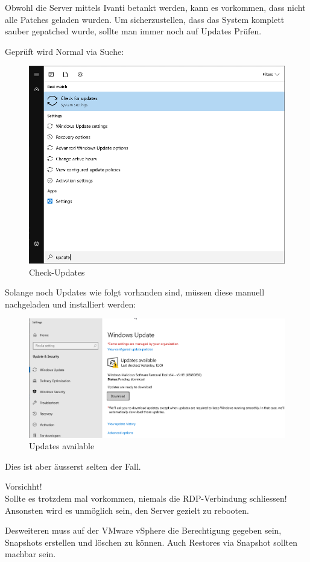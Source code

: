 \begin{flushleft}
    Obwohl die Server mittels \Gls{Ivanti} betankt werden, kann es vorkommen, dass nicht alle Patches geladen wurden.
    Um sicherzustellen, dass das System komplett sauber gepatched wurde, sollte man immer noch auf Updates Prüfen.

    Geprüft wird Normal via Suche:
    \begin{figure}[H]
        \centering
        \includegraphics[width=1\linewidth]{source/general/search_for_updates}
        \caption{Check-Updates}
        \label{fig:check-updates}
    \end{figure}

    Solange noch Updates wie folgt vorhanden sind, müssen diese manuell nachgeladen und installiert werden:
    \begin{figure}[H]
        \centering
        \includegraphics[width=1\linewidth]{source/general/updates_available}
        \caption{Updates available}
        \label{fig:updates-available}
    \end{figure}

    Dies ist aber äusserst selten der Fall.

    \begin{mdframed}
    Vorsichht!\\Sollte es trotzdem mal vorkommen, niemals die \Gls{RDP}-Verbindung schliessen!\\Ansonsten wird es unmöglich sein, den Server gezielt zu rebooten.
    \end{mdframed}
\end{flushleft}
\begin{flushleft}
    Desweiteren muss auf der \Gls{VMware vSphere} die Berechtigung gegeben sein, Snapshots erstellen und löschen zu können.
    Auch Restores via Snapshot sollten machbar sein.
\end{flushleft}